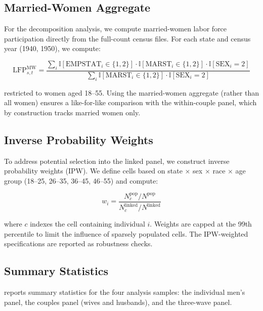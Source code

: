 \documentclass[12pt]{article}
\newcommand{\ind}{\mathbb{I}}
\begin{document}
\subsection{Married-Women Aggregate}

For the decomposition analysis, we compute married-women labor force participation directly from the full-count census files. For each state and census year (1940, 1950), we compute:

\begin{equation}
\text{LFP}_{s,t}^{\text{MW}} = \frac{\sum_i \ind[\text{EMPSTAT}_i \in \{1,2\}] \cdot \ind[\text{MARST}_i \in \{1,2\}] \cdot \ind[\text{SEX}_i = 2]}{\sum_i \ind[\text{MARST}_i \in \{1,2\}] \cdot \ind[\text{SEX}_i = 2]}
\end{equation}

\noindent restricted to women aged 18--55. Using the married-women aggregate (rather than all women) ensures a like-for-like comparison with the within-couple panel, which by construction tracks married women only.

\subsection{Inverse Probability Weights}

To address potential selection into the linked panel, we construct inverse probability weights (IPW). We define cells based on state $\times$ sex $\times$ race $\times$ age group (18--25, 26--35, 36--45, 46--55) and compute:

\begin{equation}
w_{i} = \frac{N_c^{\text{pop}} / N^{\text{pop}}}{N_c^{\text{linked}} / N^{\text{linked}}}
\end{equation}

\noindent where $c$ indexes the cell containing individual $i$. Weights are capped at the 99th percentile to limit the influence of sparsely populated cells. The IPW-weighted specifications are reported as robustness checks.

\subsection{Summary Statistics}

 reports summary statistics for the four analysis samples: the individual men's panel, the couples panel (wives and husbands), and the three-wave panel.


\end{document}
